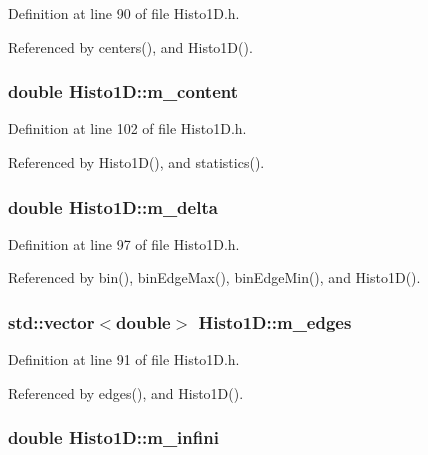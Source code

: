 Definition at line 90 of file Histo1D.h.

Referenced by centers(), and Histo1D().\hypertarget{classHisto1D_a75f4abeae577e232f4c012cb6b4049d7}{
\subsubsection[{m\_\-content}]{\setlength{\rightskip}{0pt plus 5cm}double {\bf Histo1D::m\_\-content}}}
\label{classHisto1D_a75f4abeae577e232f4c012cb6b4049d7}


Definition at line 102 of file Histo1D.h.

Referenced by Histo1D(), and statistics().\hypertarget{classHisto1D_a993e2e40b89e257e6f86c0742f6f06b3}{
\subsubsection[{m\_\-delta}]{\setlength{\rightskip}{0pt plus 5cm}double {\bf Histo1D::m\_\-delta}}}
\label{classHisto1D_a993e2e40b89e257e6f86c0742f6f06b3}


Definition at line 97 of file Histo1D.h.

Referenced by bin(), binEdgeMax(), binEdgeMin(), and Histo1D().\hypertarget{classHisto1D_a4188c6d1b4bfc8f9d8bde7616b4dbf5b}{
\subsubsection[{m\_\-edges}]{\setlength{\rightskip}{0pt plus 5cm}std::vector$<$double$>$ {\bf Histo1D::m\_\-edges}}}
\label{classHisto1D_a4188c6d1b4bfc8f9d8bde7616b4dbf5b}


Definition at line 91 of file Histo1D.h.

Referenced by edges(), and Histo1D().\hypertarget{classHisto1D_a47c1ba33be0574ca167f43a1b27ba1a0}{
\subsubsection[{m\_\-infini}]{\setlength{\rightskip}{0pt plus 5cm}double {\bf Histo1D::m\_\-infini}}}
\label{classHisto1D_a47c1ba33be0574ca167f43a1b27ba1a0}


